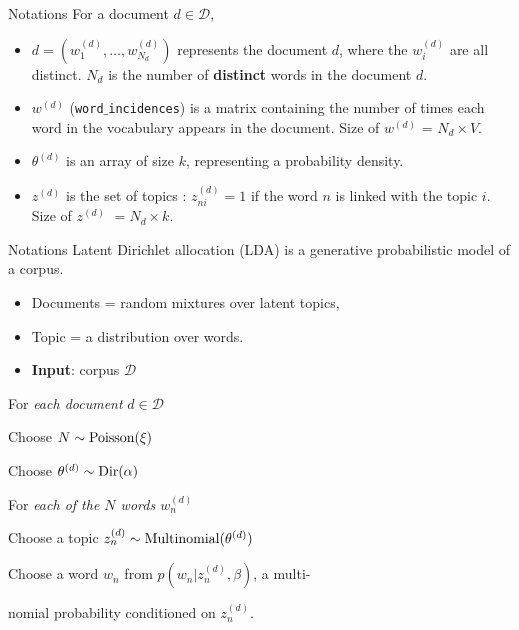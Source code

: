 \documentclass[final]{beamer}
\newlength{\onecolwid}
\begin{document}
\begin{frame}[t]
\begin{columns}[t]
\begin{column}{\onecolwid}
\begin{block}{Notations}
For a document $d \in \mathcal{D}$,
\begin{itemize}  
  \item $d = (w_1^{(d)}, \ldots, w_{N_d}^{(d)})$ represents the document $d$, where the $w_i^{(d)}$ are all distinct. $N_d$ is the number of \textbf{distinct} words in the document $d$.
  \item $w^{(d)}$ (\texttt{word$\_$incidences}) is a matrix containing the number of times each word in the vocabulary appears in the document. Size of $w^{(d)}$ = $N_d \times V$.
 \item $\theta^{(d)}$ is an array of size $k$, representing a probability density.
 \item $z^{(d)}$ is the set of topics : $z_{ni}^{(d)} =  1$ if the word $n$ is linked with the topic $i$. Size of $z^{(d)}$ $= N_d \times k$.
\end{itemize}
\end{block}


\begin{block}{Notations}
Latent Dirichlet allocation (LDA) is a generative probabilistic model of a corpus. 
\begin{itemize}
  \item Documents = random mixtures over latent topics,
  \item Topic = a distribution over words. 
\end{itemize} 

\medskip

\begin{itemize}
  \item \textbf{Input}: {corpus $\mathcal{D}$}
\end{itemize}

For {\emph{each document} $d \in \mathcal{D}$}{

\quad Choose $N \sim \textnormal{Poisson}(\xi)$

\quad Choose $\theta^{(d)} \sim \textnormal{Dir}(\alpha)$

\quad For {\emph{each of the $N$ words $w_n^{(d)}$}}{

\quad\quad Choose a topic $z_n^{(d)} \sim  \textnormal{Multinomial}(\theta^{(d)})$

\quad\quad Choose a word $w_n$ from $p(w_n |z_n^{(d)}, \beta)$, a multi-

\quad\quad nomial probability conditioned on $z_n^{(d)}$.
}
}
\end{block}

\end{column} %


\end{columns}
\end{frame}
\end{document}

